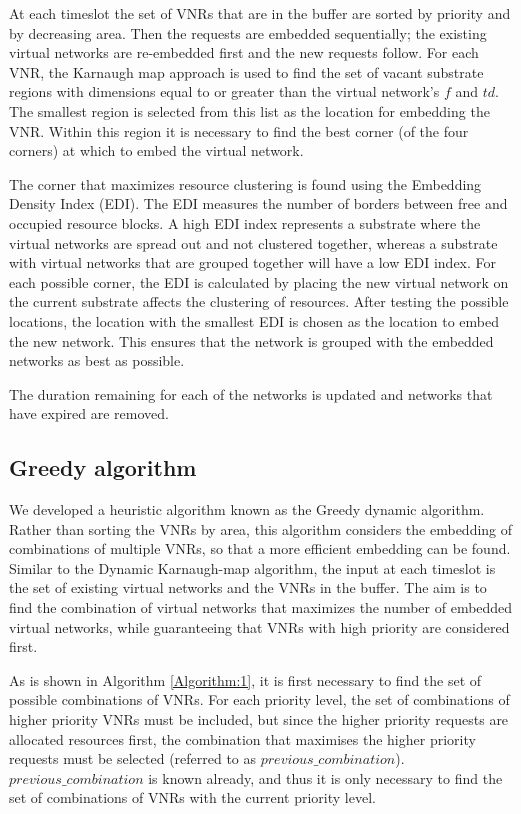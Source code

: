 \documentclass[conference]{IEEEtran}
\begin{document}
At each timeslot the set of VNRs that are in the buffer are sorted by priority and by decreasing area. Then the requests are embedded sequentially; the existing virtual networks are re-embedded first and the new requests follow. For each VNR, the Karnaugh map approach is used to find the set of vacant substrate regions with dimensions equal to or greater than the virtual network's $f$ and $td$. The smallest region is selected from this list as the location for embedding the VNR. Within this region it is necessary to find the best corner (of the four corners) at which to embed the virtual network.

The corner that maximizes resource clustering is found using the Embedding Density Index (EDI). The EDI measures the number of borders between free and occupied resource blocks. A high EDI index represents a substrate where the virtual networks are spread out and not clustered together, whereas a substrate with virtual networks that are grouped together will have a low EDI index. For each possible corner, the EDI is calculated by placing the new virtual network on the current substrate affects the clustering of resources. After testing the possible locations, the location with the smallest EDI is chosen as the location to embed the new network. This ensures that the network is grouped with the embedded networks as best as possible.

The duration remaining for each of the networks is updated and networks that have expired are removed.




\subsection{Greedy algorithm}

We developed a heuristic algorithm known as the Greedy dynamic algorithm. Rather than sorting the VNRs by area, this algorithm considers the embedding of combinations of multiple VNRs, so that a more efficient embedding can be found. Similar to the Dynamic Karnaugh-map algorithm, the input at each timeslot is the set of existing virtual networks and the VNRs in the buffer. The aim is to find the combination of virtual networks that maximizes the number of embedded virtual networks, while guaranteeing that VNRs with high priority are considered first.

As is shown in Algorithm \ref{Algorithm:1}, it is first necessary to find the set of possible combinations of VNRs. For each priority level, the set of combinations of higher priority VNRs must be included, but since the higher priority requests are allocated resources first, the combination that maximises the higher priority requests must be selected (referred to as $previous\_combination$). $previous\_combination$ is known already, and thus it is only necessary to find the set of combinations of VNRs with the current priority level.
\end{document}
